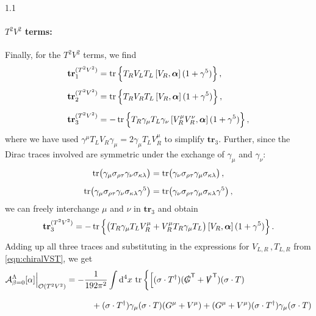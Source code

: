 \documentclass[a4paper,12pt]{article}
\def\O{{\cal O}}
\def\Acal{{\cal A}}
\def\mat#1{\boldsymbol{#1}}
\def\T{\textsf{T}}
\def\Gsl{\slashed{G}}
\def\Vsl{\slashed{V}}
\def\alphamat{\mat{\alpha}}
\def\btr{\mathbf{tr}}
\begin{document}
\begin{spacing}{1.1}
\paragraph{$T^2V^2$ terms:}
Finally, for the $T^2V^2$ terms, we find
\begin{subequations}
\begin{align}
\btr_1^{(T^2V^2)} &= \tr \Big\{T_R V_L T_L\, \comm{V_R}{\alphamat}\, (1+\gamma^5) \Big\} \,, \\[5pt]
\btr_2^{(T^2V^2)} &= \tr \Big\{ T_R V_R T_L\, \comm{V_R}{\alphamat}\, (1+\gamma^5) \Big\} \,, \\[5pt]
\btr_3^{(T^2V^2)} &= -\tr \Big\{ T_R \gamma_\mu T_L \gamma_\nu\, \comm{V_R^\mu V_R^\nu}{\alphamat}\, (1+\gamma^5) \Big\} \,,
\end{align}
\end{subequations}
where we have used $\gamma^\mu T_L V_R\gamma_\mu = 2\gamma_\mu T_L V_R^\mu$ to simplify $\btr_3$. Further, since the Dirac traces involved are symmetric under the exchange of $\gamma_\mu$ and $\gamma_\nu$:
\begin{subequations}
\begin{align}
\tr \bigl(\gamma_\mu \sigma_{\rho\tau} \gamma_\nu \sigma_{\kappa\lambda} \bigr) &= \tr \bigl(\gamma_\nu \sigma_{\rho\tau} \gamma_\mu \sigma_{\kappa\lambda} \bigr) \,,\\[5pt]
\tr \bigl(\gamma_\mu \sigma_{\rho\tau} \gamma_\nu \sigma_{\kappa\lambda} \gamma^5 \bigr) &= \tr \bigl(\gamma_\nu \sigma_{\rho\tau} \gamma_\mu \sigma_{\kappa\lambda} \gamma^5 \bigr) \,,
\end{align}
\end{subequations}
we can freely interchange $\mu$ and $\nu$ in $\btr_3$ and obtain
\begin{equation}
\btr_3^{(T^2V^2)} = - \tr \Big\{ \big(T_R \gamma_\mu T_L V_R^\mu + V_R^\mu T_R \gamma_\mu T_L \big)\, \comm{V_R}{\alphamat}\, (1+\gamma^5) \Big\} \,.
\end{equation}
Adding up all three traces and substituting in the expressions for $V_{L,R}\,, T_{L,R}$ from \cref{eqn:chiralVST}, we get
\begin{align}
\Acal_{\beta=0}^\Lambda[\alpha]\Bigr|_{\O(T^2V^2)} &= -\frac{1}{192\pi^2} \int \dd^4x\, \tr \bigg\{
\Big[ (\sigma\cdot T^\dagger) (\Gsl^\T + \Vsl^\T ) (\sigma\cdot T)
\notag\\[8pt]
&\hspace{30pt}
+ (\sigma\cdot T^\dagger) \gamma_\mu (\sigma\cdot T) ( G^\mu + V^\mu )
+ ( G^\mu + V^\mu ) (\sigma\cdot T^\dagger) \gamma_\mu (\sigma\cdot T)

\end{align}
\end{spacing}
\end{document}
